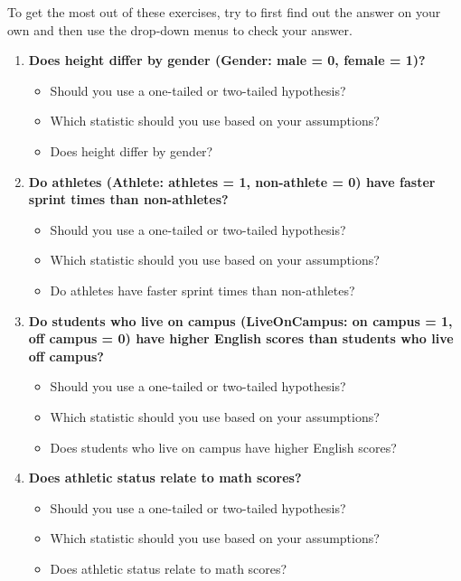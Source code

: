 \documentclass[
]{book}
\begin{document}
To get the most out of these exercises, try to first find out the answer on your own and then use the drop-down menus to check your answer.

\begin{enumerate}
\def\labelenumi{\arabic{enumi}.}
\item
  \textbf{Does height differ by gender (Gender: male = 0, female = 1)?}

  \begin{itemize}
  \item
    Should you use a one-tailed or two-tailed hypothesis?
  \item
    Which statistic should you use based on your assumptions?
  \item
    Does height differ by gender?
  \end{itemize}
\item
  \textbf{Do athletes (Athlete: athletes = 1, non-athlete = 0) have faster sprint times than non-athletes?}

  \begin{itemize}
  \item
    Should you use a one-tailed or two-tailed hypothesis?
  \item
    Which statistic should you use based on your assumptions?
  \item
    Do athletes have faster sprint times than non-athletes?
  \end{itemize}
\item
  \textbf{Do students who live on campus (LiveOnCampus: on campus = 1, off campus = 0) have higher English scores than students who live off campus?}

  \begin{itemize}
  \item
    Should you use a one-tailed or two-tailed hypothesis?
  \item
    Which statistic should you use based on your assumptions?
  \item
    Does students who live on campus have higher English scores?
  \end{itemize}
\item
  \textbf{Does athletic status relate to math scores?}

  \begin{itemize}
  \item
    Should you use a one-tailed or two-tailed hypothesis?
  \item
    Which statistic should you use based on your assumptions?
  \item
    Does athletic status relate to math scores?
  \end{itemize}
\end{enumerate}
\end{document}
